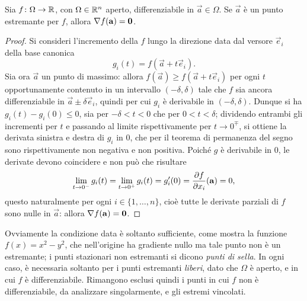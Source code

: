 \begin{teorema}[di Fermat]
Sia $f\colon\Omega\to\mathbb{R}$, con $\Omega\in\mathbb{R}^n$ aperto, differenziabile in $\vec a\in\Omega$. Se $\vec a$ è un punto estremante per $f$, allora $\nabla f(\mathbf{a})=\mathbf{0}$.
\end{teorema}
\begin{proof}
Si consideri l'incremento della $f$ lungo la direzione data dal versore $\vec e_i$ della base canonica
\[
g_i(t)=f(\vec a+t\vec e_i).
\]
Sia ora $\vec a$ un punto di massimo: allora $f(\vec a)\geq f(\vec a+t\vec e_i)$ per ogni $t$ opportunamente contenuto in un intervallo $(-\delta,\delta)$ tale che $f$ sia ancora differenziabile in $\vec a\pm\delta\vec e_i$, quindi per cui $g_i$ è derivabile in $(-\delta,\delta)$.
Dunque si ha $g_i(t)-g_i(0)\leq 0$, sia per $-\delta<t<0$ che per $0<t<\delta$; dividendo entrambi gli incrementi per $t$ e passando al limite rispettivamente per $t\to0^\mp$, si ottiene la derivata sinistra e destra di $g_i$ in $0$, che per il teorema di permanenza del segno sono rispettivamente non negativa e non positiva. Poiché $g$ è derivabile in $0$, le derivate devono coincidere e non può che risultare
\[
\lim_{t\to 0^-}g_i(t)=\lim_{t\to 0^+}g_i(t)=g_i'(0)=\frac{\partial {f}}{\partial {x_i}}(\mathbf{a})=0,
\]
questo naturalmente per ogni $i\in\{1,\dots,n\}$, cioè tutte le derivate parziali di $f$ sono nulle in $\vec a$: allora $\nabla f(\mathbf{a})=\mathbf{0}$.
\end{proof}
Ovviamente la condizione data è soltanto sufficiente, come mostra la funzione $f(x)=x^2-y^2$, che nell'origine ha gradiente nullo ma tale punto non è un estremante; i punti stazionari non estremanti si dicono \emph{punti di sella}. In ogni caso, è necessaria soltanto per i punti estremanti \emph{liberi}, dato che $\Omega$ è aperto, e in cui $f$ è differenziabile. Rimangono esclusi quindi i punti in cui $f$ non è differenziabile, da analizzare singolarmente, e gli estremi vincolati.

